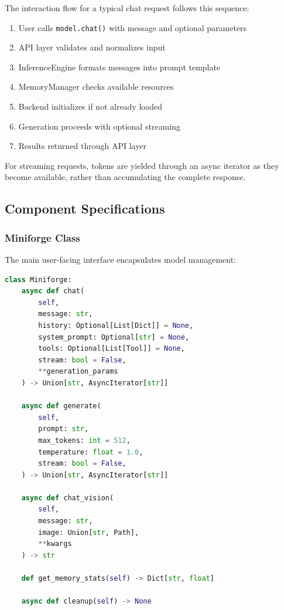 The interaction flow for a typical chat request follows this sequence:

\begin{enumerate}
    \item User calls \texttt{model.chat()} with message and optional parameters
    \item API layer validates and normalizes input
    \item InferenceEngine formats messages into prompt template
    \item MemoryManager checks available resources
    \item Backend initializes if not already loaded
    \item Generation proceeds with optional streaming
    \item Results returned through API layer
\end{enumerate}

For streaming requests, tokens are yielded through an async iterator as they become available, rather than accumulating the complete response.

\subsection{Component Specifications}

\subsubsection{Miniforge Class}

The main user-facing interface encapsulates model management:

\begin{lstlisting}[language=Python, caption=Miniforge Interface]
class Miniforge:
    async def chat(
        self,
        message: str,
        history: Optional[List[Dict]] = None,
        system_prompt: Optional[str] = None,
        tools: Optional[List[Tool]] = None,
        stream: bool = False,
        **generation_params
    ) -> Union[str, AsyncIterator[str]]
    
    async def generate(
        self,
        prompt: str,
        max_tokens: int = 512,
        temperature: float = 1.0,
        stream: bool = False,
    ) -> Union[str, AsyncIterator[str]]
    
    async def chat_vision(
        self,
        message: str,
        image: Union[str, Path],
        **kwargs
    ) -> str
    
    def get_memory_stats(self) -> Dict[str, float]
    
    async def cleanup(self) -> None
\end{lstlisting}

